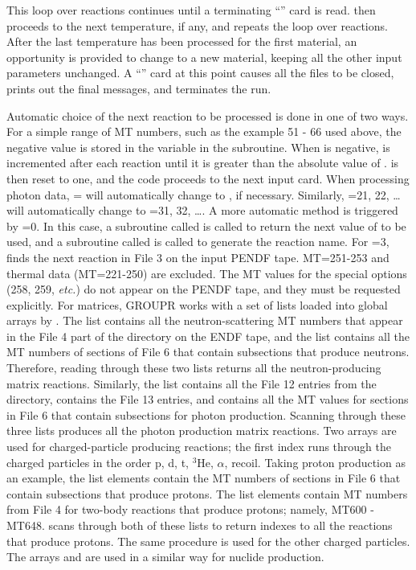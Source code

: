 This loop over reactions continues until a terminating ``'' card is
read.   then proceeds to the next temperature, if any, and
repeats the loop over reactions.  After the last temperature has been
processed for the first material, an opportunity is provided to change
to a new material, keeping all the other input parameters unchanged.
A ``'' card at this point causes all the files to be closed, prints
out the final messages, and terminates the  run.

Automatic choice of the next reaction to be processed is done in one of
two ways.  For a simple range of MT numbers, such as the example 51 - 66
used above, the negative value is stored in the variable 
in the  subroutine.  When  is negative,
 is incremented after each reaction until it is greater than
the absolute value of .   is then reset to one,
and the code proceeds to the next input card.  When processing photon
data, =
will automatically change to , if necessary.  Similarly,
=21, 22, \ldots will automatically change to
=31, 32, \ldots.  A more automatic method is triggered by
=0.  In this case, a subroutine called
 is called to return
the next value of  to be used, and a subroutine called
 is called to generate the
reaction name.  For =3,  finds the next
reaction in File 3 on the input PENDF tape.  MT=251-253 and
thermal data (MT=221-250) are excluded.  The MT values for the
special options (258, 259, {\it etc.}) do not appear on the PENDF
tape, and they must be requested explicitly.  For matrices,
GROUPR works with a set of lists loaded into global arrays by
.  The list 
contains all the neutron-scattering MT numbers that appear in the
File 4 part of the directory on the ENDF tape, and the list
 contains all the MT numbers of sections of File 6 that
contain subsections that produce neutrons.  Therefore, reading
through these two lists returns all the neutron-producing matrix
reactions.  Similarly, the list  contains all the
File 12 entries from the directory,  contains the
File 13 entries, and  contains all the MT
values for sections in File 6 that contain subsections for photon
production.  Scanning through these three lists produces all the
photon production matrix reactions.  Two arrays are used for
charged-particle producing reactions; the first index runs through
the charged particles in the order p, d, t, $^3$He, $\alpha$, recoil.
Taking proton production as an example, the list elements
 contain the MT numbers of sections in File 6 that
contain subsections that produce protons.  The list elements
 contain MT numbers from File 4 for two-body reactions
that produce protons; namely, MT600 - MT648.   scans through
both of these lists to return indexes to all the reactions that produce
protons.  The same procedure is used for the other charged particles.
The arrays  and  are used in a similar
way for nuclide production.

